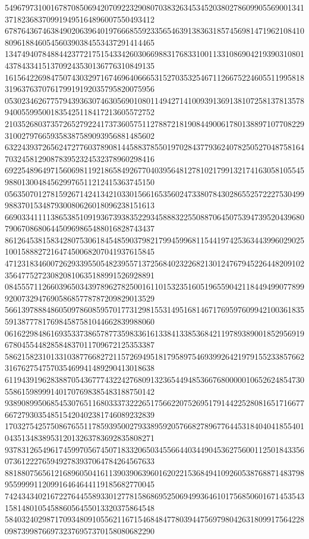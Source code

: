 \begin{DoxyCode}
      549679731001678708506942070922329080703832634534520380278609905569001341371823683709919495164896007550493412
      678764367463849020639640197666855923356546391383631857456981471962108410809618846054560390384553437291414465
      134749407848844237721751543342603066988317683310011331086904219390310801437843341513709243530136776310849135
      161564226984750743032971674696406665315270353254671126675224605511995818319637637076179919192035795820075956
      053023462677579439363074630569010801149427141009391369138107258137813578940055995001835425118417213605572752
      210352680373572652792241737360575112788721819084490061780138897107708229310027976659358387589093956881485602
      632243937265624727760378908144588378550197028437793624078250527048758164703245812908783952324532378960298416
      692254896497156069811921865849267704039564812781021799132174163058105545988013004845629976511212415363745150
      056350701278159267142413421033015661653560247338078430286552572227530499988370153487930080626018096238151613
      669033411113865385109193673938352293458883225508870645075394739520439680790670868064450969865488016828743437
      861264538158342807530618454859037982179945996811544197425363443996029025100158882721647450068207041937615845
      471231834600726293395505482395571372568402322682130124767945226448209102356477527230820810635188991526928891
      084555711266039650343978962782500161101532351605196559042118449499077899920073294769058685778787209829013529
      566139788848605097860859570177312981553149516814671769597609942100361835591387778176984587581044662839988060
      061622984861693533738657877359833616133841338536842119789389001852956919678045544828584837011709672125353387
      586215823101331038776682721157269495181795897546939926421979155233857662316762754757035469941489290413018638
      611943919628388705436777432242768091323654494853667680000010652624854730558615989991401707698385483188750142
      938908995068545307651168033373222651756622075269517914422528081651716677667279303548515420402381746089232839
      170327542575086765511785939500279338959205766827896776445318404041855401043513483895312013263783692835808271
      937831265496174599705674507183320650345566440344904536275600112501843356073612227659492783937064784264567633
      881880756561216896050416113903906396016202215368494109260538768871483798955999911209916464644119185682770045
      742434340216722764455893301277815868695250694993646101756850601671453543158148010545886056455013320375864548
      584032402987170934809105562116715468484778039447569798042631809917564228098739987669732376957370158080682290

\end{DoxyCode}
